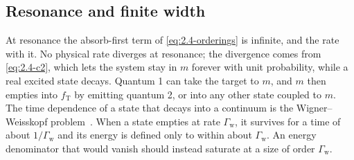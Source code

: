 \subsection{Resonance and finite width}

At resonance the absorb-first term of \cref{eq:2.4-orderings} is infinite, and the rate with it. No physical rate diverges at resonance; the divergence comes from \cref{eq:2.4-c2}, which lets the system stay in $m$ forever with unit probability, while a real excited state decays. Quantum 1 can take the target to $m$, and $m$ then empties into $f_{\mathrm{T}}$ by emitting quantum 2, or into any other state coupled to $m$. The time dependence of a state that decays into a continuum is the Wigner--Weisskopf problem~\cite{weisskopf1930berechnung}. When a state empties at rate $\varGamma_{\mathrm{w}}$, it survives for a time of about $1/\varGamma_{\mathrm{w}}$ and its energy is defined only to within about $\varGamma_{\mathrm{w}}$. An energy denominator that would vanish should instead saturate at a size of order $\varGamma_{\mathrm{w}}$.

